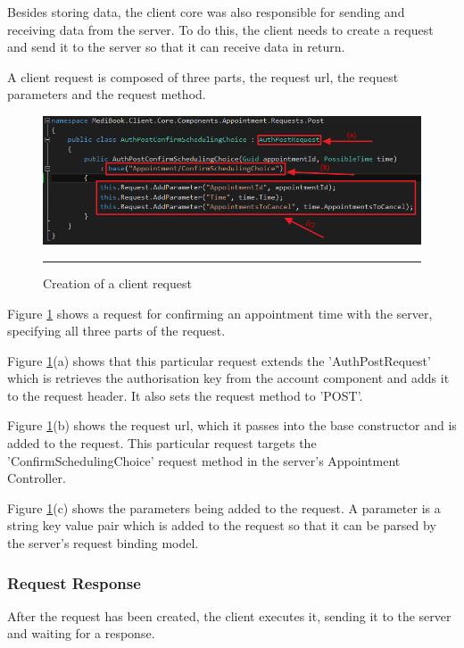 Besides storing data, the client core was also responsible for sending and receiving data from the server. To do this, the client needs to create a request and send it to the server so that it can receive data in return.

A client request is composed of three parts, the request url, the request parameters and the request method.

\begin{figure}[htbp]
	\centering
		\includegraphics[width=\textwidth,height=\textheight,keepaspectratio]{Figures/ExampleRequest.png}
		\rule{35em}{0.5pt}
		\caption[Creation of a client request]{Creation of a client request}
	\label{fig:examplerequest}
\end{figure}

Figure \ref{fig:examplerequest} shows a request for confirming an appointment time with the server, specifying all three parts of the request.

Figure \ref{fig:examplerequest}(a) shows that this particular request extends the 'AuthPostRequest' which is retrieves the authorisation key from the account component and adds it to the request header. It also sets the request method to 'POST'.

Figure \ref{fig:examplerequest}(b) shows the request url, which it passes into the base constructor and is added to the request. This particular request targets the 'ConfirmSchedulingChoice' request method in the server's Appointment Controller.

Figure \ref{fig:examplerequest}(c) shows the parameters being added to the request. A parameter is a string key value pair which is added to the request so that it can be parsed by the server's request binding model.

\subsubsection{Request Response}

After the request has been created, the client executes it, sending it to the server and waiting for a response.

